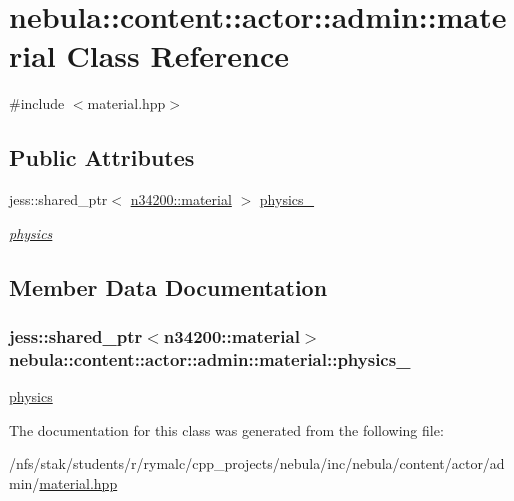 \hypertarget{classnebula_1_1content_1_1actor_1_1admin_1_1material}{
\section{nebula::content::actor::admin::material Class Reference}
\label{classnebula_1_1content_1_1actor_1_1admin_1_1material}
}


{\ttfamily \#include $<$material.hpp$>$}\subsection*{Public Attributes}
\begin{DoxyCompactItemize}
\item 
jess::shared\_\-ptr$<$ \hyperlink{classnebula_1_1content_1_1actor_1_1physics_1_1material}{n34200::material} $>$ \hyperlink{classnebula_1_1content_1_1actor_1_1admin_1_1material_ad7886c4870636cfd1dfc6ed8c9adf28b}{physics\_\-}
\begin{DoxyCompactList}\small\item\em \hyperlink{namespacenebula_1_1content_1_1actor_1_1physics}{physics} \item\end{DoxyCompactList}\end{DoxyCompactItemize}


\subsection{Member Data Documentation}
\hypertarget{classnebula_1_1content_1_1actor_1_1admin_1_1material_ad7886c4870636cfd1dfc6ed8c9adf28b}{
\subsubsection[{physics\_\-}]{\setlength{\rightskip}{0pt plus 5cm}jess::shared\_\-ptr$<${\bf n34200::material}$>$ {\bf nebula::content::actor::admin::material::physics\_\-}}}
\label{classnebula_1_1content_1_1actor_1_1admin_1_1material_ad7886c4870636cfd1dfc6ed8c9adf28b}


\hyperlink{namespacenebula_1_1content_1_1actor_1_1physics}{physics} 

The documentation for this class was generated from the following file:\begin{DoxyCompactItemize}
\item 
/nfs/stak/students/r/rymalc/cpp\_\-projects/nebula/inc/nebula/content/actor/admin/\hyperlink{admin_2material_8hpp}{material.hpp}\end{DoxyCompactItemize}
